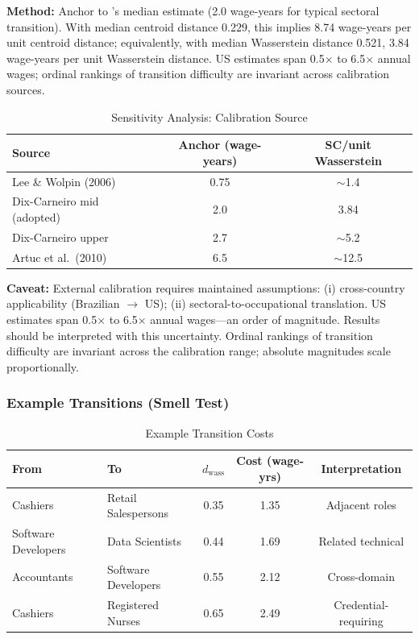 \documentclass[12pt]{article}
\begin{document}
\textbf{Method:} Anchor to \citet{DixCarneiro2014}'s median estimate (2.0 wage-years for typical sectoral transition). With median centroid distance 0.229, this implies 8.74 wage-years per unit centroid distance; equivalently, with median Wasserstein distance 0.521, 3.84 wage-years per unit Wasserstein distance. US estimates span 0.5$\times$ to 6.5$\times$ annual wages; ordinal rankings of transition difficulty are invariant across calibration sources.


\begin{table}[h!]
\centering
\caption{Sensitivity Analysis: Calibration Source}
\label{tab:calibration-sensitivity}
\begin{tabular}{lcc}
\toprule
\textbf{Source} & \textbf{Anchor (wage-years)} & \textbf{SC/unit Wasserstein} \\
\midrule
Lee \& Wolpin (2006) & 0.75 & $\sim$1.4 \\
Dix-Carneiro mid (adopted) & 2.0 & 3.84 \\
Dix-Carneiro upper & 2.7 & $\sim$5.2 \\
Artuc et al.\ (2010) & 6.5 & $\sim$12.5 \\
\bottomrule
\end{tabular}
\end{table}


\textbf{Caveat:} External calibration requires maintained assumptions: (i) cross-country applicability (Brazilian $\to$ US); (ii) sectoral-to-occupational translation. US estimates span 0.5$\times$ to 6.5$\times$ annual wages---an order of magnitude. Results should be interpreted with this uncertainty. Ordinal rankings of transition difficulty are invariant across the calibration range; absolute magnitudes scale proportionally.


\subsubsection{Example Transitions (Smell Test)}


\begin{table}[h!]
\centering
\caption{Example Transition Costs}
\label{tab:example-transitions}
\begin{tabular}{llccc}
\toprule
\textbf{From} & \textbf{To} & \textbf{$d_{\mathrm{wass}}$} & \textbf{Cost (wage-yrs)} & \textbf{Interpretation} \\
\midrule
Cashiers & Retail Salespersons & 0.35 & 1.35 & Adjacent roles \\
Software Developers & Data Scientists & 0.44 & 1.69 & Related technical \\
Accountants & Software Developers & 0.55 & 2.12 & Cross-domain \\
Cashiers & Registered Nurses & 0.65 & 2.49 & Credential-requiring \\
\bottomrule
\end{tabular}
\end{table}
\end{document}
